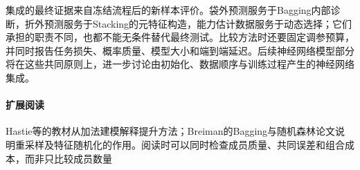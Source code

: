 集成的最终证据来自冻结流程后的新样本评价。袋外预测服务于Bagging内部诊断，折外预测服务于Stacking的元特征构造，能力估计数据服务于动态选择；它们承担的职责不同，也都不能无条件替代最终测试。比较方法时还要固定调参预算，并同时报告任务损失、概率质量、模型大小和端到端延迟。后续神经网络模型部分将在这些共同原则上，进一步讨论由初始化、数据顺序与训练过程产生的神经网络集成。

\paragraph{扩展阅读}
Hastie等的教材从加法建模解释提升方法；Breiman的Bagging与随机森林论文说明重采样及特征随机化的作用。阅读时可以同时检查成员质量、共同误差和组合成本，而非只比较成员数量
